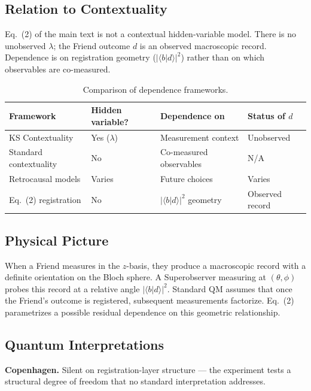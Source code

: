 \documentclass[12pt]{article}
\begin{document}
\subsection{Relation to Contextuality}

Eq.~(2) of the main text is not a contextual hidden-variable model. There is no unobserved $\lambda$; the Friend outcome $d$ is an observed macroscopic record. Dependence is on registration geometry ($|\langle b|d\rangle|^2$) rather than on which observables are co-measured.

\begin{table}[h]
\centering
\caption{Comparison of dependence frameworks.}
\begin{tabular}{p{}p{}p{}p{}}
\toprule
Framework & Hidden variable? & Dependence on & Status of $d$ \\
\midrule
KS Contextuality & Yes ($\lambda$) & Measurement context & Unobserved \\
Standard contextuality & No & Co-measured observables & N/A \\
Retrocausal models & Varies & Future choices & Varies \\
Eq.~(2) registration & No & $|\langle b|d\rangle|^2$ geometry & Observed record \\
\bottomrule
\end{tabular}
\end{table}

\subsection{Physical Picture}

When a Friend measures in the $z$-basis, they produce a macroscopic record with a definite orientation on the Bloch sphere. A Superobserver measuring at $(\theta,\phi)$ probes this record at a relative angle $|\langle b|d\rangle|^2$. Standard QM assumes that once the Friend's outcome is registered, subsequent measurements factorize. Eq.~(2) parametrizes a possible residual dependence on this geometric relationship.

\subsection{Quantum Interpretations}

\textbf{Copenhagen.} Silent on registration-layer structure --- the experiment tests a structural degree of freedom that no standard interpretation addresses.
\end{document}
